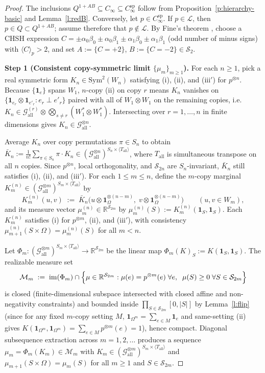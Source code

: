 \documentclass[11pt,a4paper]{article}
\theoremstyle{definition}
\theoremstyle{remark}
\newcommand{\ind}[1]{\mathbf{1}_{#1}}
\newcommand{\ev}[1]{\langle #1\rangle_p}
\newcommand{\QAB}{Q^{1+AB}}
\newcommand{\Loc}{\mathcal{L}}
\newcommand{\Gall}{\mathcal{G}_{\mathrm{all}}}
\newcommand{\Sym}{\mathrm{Sym}}
\DeclareMathOperator{\im}{im}
\begin{document}
\begin{proof}
The inclusions $\QAB \subseteq C_\infty \subseteq C_\infty^{\mathrm{sp}}$ follow from Proposition~\ref{p:hierarchy-basic} and Lemma~\ref{l:redB}. Conversely, let $p \in C_\infty^{\mathrm{sp}}$. If $p \in \Loc$, then $p \in Q \subset \QAB$; assume therefore that $p \notin \Loc$. By Fine's theorem \cite{Fine}, choose a CHSH expression $C = \pm\alpha_0\beta_0 \pm \alpha_0\beta_1 \pm \alpha_1\beta_0 \pm \alpha_1\beta_1$ (odd number of minus signs) with $\ev{C} > 2$, and set $A := \{C = +2\}$, $B := \{C = -2\} \in \mathcal{S}_2$.

\medskip\noindent\textbf{Step 1 (Consistent copy-symmetric limit $\{\mu_m\}_{m \ge 1}$).}
For each $n \ge 1$, pick a real symmetric form $K_n \in \Sym^2(W_n)$ satisfying (i), (ii), and (iii$'$) for $p^{\otimes n}$. Because $\{\ind e\}$ spans $W_1$, $n$-copy (ii) on copy $r$ means $K_n$ vanishes on $\{\ind{e_r} \otimes \ind{e'_r} : e_r \perp e'_r\}$ paired with all of $W_1 \otimes W_1$ on the remaining copies, i.e.\ $K_n \in \Gall^{(r)} \otimes \bigotimes_{s \neq r} (W_1^* \otimes W_1^*)$. Intersecting over $r = 1, \dots, n$ in finite dimensions gives $K_n \in \Gall^{\otimes n}$.

Average $K_n$ over copy permutations $\pi \in S_n$ to obtain $\bar{K}_n := \frac{1}{n!} \sum_{\pi \in S_n} \pi \cdot K_n \in (\Gall^{\otimes n})^{S_n \times \langle T_{\mathrm{all}} \rangle}$, where $T_{\mathrm{all}}$ is simultaneous transpose on all $n$ copies. Since $p^{\otimes n}$, local orthogonality, and $\mathcal{S}_{2n}$ are $S_n$-invariant, $\bar{K}_n$ still satisfies (i), (ii), and (iii$'$). For each $1 \le m \le n$, define the $m$-copy marginal $K_m^{(n)} \in (\Gall^{\otimes m})^{S_m \times \langle T_{\mathrm{all}} \rangle}$ by
\[
  K_m^{(n)}(u, v) \;:=\; \bar{K}_n\bigl(u \otimes \ind\Omega^{\otimes(n-m)},\; v \otimes \ind\Omega^{\otimes(n-m)}\bigr) \qquad (u, v \in W_m),
\]
and its measure vector $\mu_m^{(n)} \in \mathbb{R}^{\mathcal{S}_{2m}}$ by $\mu_m^{(n)}(S) := K_m^{(n)}(\ind S, \ind S)$. Each $K_m^{(n)}$ satisfies (i) for $p^{\otimes m}$, (ii), and (iii$'$), with consistency $\mu_{m+1}^{(n)}(S \times \Omega) = \mu_m^{(n)}(S)$ for all $m < n$.

Let $\Phi_m : (\Gall^{\otimes m})^{S_m \times \langle T_{\mathrm{all}} \rangle} \to \mathbb{R}^{\mathcal{S}_{2m}}$ be the linear map $\Phi_m(K)_S := K(\ind S, \ind S)$. The realizable measure set
\[
  \mathcal{M}_m \;:=\; \im(\Phi_m) \cap \Bigl\{\mu \in \mathbb{R}^{\mathcal{S}_{2m}} : \mu(e) = p^{\otimes m}(e)\;\forall e,\;\; \mu(S) \ge 0\;\forall S \in \mathcal{S}_{2m}\Bigr\}
\]
is closed (finite-dimensional subspace intersected with closed affine and non-negativity constraints) and bounded inside $\prod_{S \in \mathcal{S}_{2m}} [0, |S|]$ by Lemma~\ref{l:flip} (since for any fixed $m$-copy setting $M$, $\ind{\Omega^m} = \sum_{e \in M} \ind e$ and same-setting (ii) gives $K(\ind{\Omega^m}, \ind{\Omega^m}) = \sum_{e \in M} p^{\otimes m}(e) = 1$), hence compact. Diagonal subsequence extraction across $m = 1, 2, \dots$ produces a sequence $\mu_m = \Phi_m(K_m) \in \mathcal{M}_m$ with $K_m \in (\Gall^{\otimes m})^{S_m \times \langle T_{\mathrm{all}} \rangle}$ and $\mu_{m+1}(S \times \Omega) = \mu_m(S)$ for all $m \ge 1$ and $S \in \mathcal{S}_{2m}$.


\end{proof}
\end{document}

